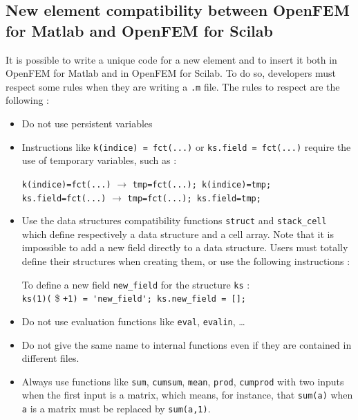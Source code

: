 \subsection{New element compatibility between OpenFEM for Matlab and OpenFEM for Scilab}
It is possible to write a unique code for a new element and to insert it both in OpenFEM for Matlab and in OpenFEM for Scilab. To do so, developers must respect some rules when they are writing a \verb+.m+ file. The rules to respect are the following :
\begin{itemize}
\item Do not use persistent variables

\item Instructions like \verb+k(indice) = fct(...)+ or \verb+ks.field = fct(...)+ require the use of temporary variables, such as :
\vspace{-0.3cm}
\begin{center}
\verb+k(indice)=fct(...)+ $\longrightarrow$ \verb+tmp=fct(...); k(indice)=tmp;+\\
\verb+ks.field=fct(...)+ $\longrightarrow$ \verb+tmp=fct(...); ks.field=tmp;+
\end{center}
\item Use the data structures compatibility functions \verb+struct+ and \verb+stack_cell+ which define respectively a data structure and a cell array. Note that it is impossible to add a new field directly to a data structure. Users must totally define their structures when creating them, or use the following instructions :
\vspace{-0.3cm}
\begin{center}
To define a new field \verb+new_field+ for the structure \verb+ks+ :\\
\verb|ks(1)(| \$ \verb|+1) = 'new_field'; ks.new_field = [];|
\end{center} 

\item Do not use evaluation functions like \verb+eval+, \verb+evalin+, \ldots

\item Do not give the same name to internal functions even if they are contained in different files.

\item Always use functions like \verb+sum+, \verb+cumsum+, \verb+mean+, \verb+prod+, \verb+cumprod+ with two inputs when the first input is a matrix, which means, for instance, that \verb+sum(a)+ when \verb+a+ is a matrix must be replaced by \verb+sum(a,1)+.


\end{itemize}
